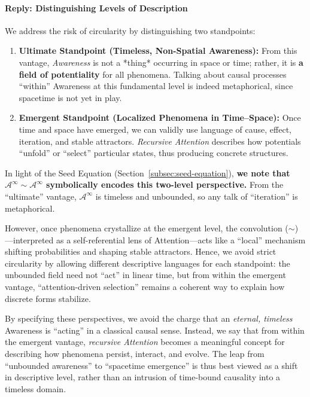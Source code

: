 \documentclass[12pt,a4paper]{article}
\begin{document}
\paragraph{Reply: Distinguishing Levels of Description}
We address the risk of circularity by distinguishing two standpoints:
\begin{enumerate}
    \item \textbf{Ultimate Standpoint (Timeless, Non-Spatial Awareness):}  
    From this vantage, \emph{Awareness} is not a *thing* occurring in space or time; rather, it is \textbf{a field of potentiality} for all phenomena. Talking about causal processes “within” Awareness at this fundamental level is indeed metaphorical, since spacetime is not yet in play.

    \item \textbf{Emergent Standpoint (Localized Phenomena in Time--Space):}  
    Once time and space have emerged, we can validly use language of cause, effect, iteration, and stable attractors. \emph{Recursive Attention} describes how potentials “unfold” or “select” particular states, thus producing concrete structures.  
\end{enumerate}

\noindent
In light of the Seed Equation (Section~\ref{subsec:seed-equation}), \textbf{we note that \(\mathscr{A}^\infty \sim \mathscr{A}^\infty\) symbolically encodes this two-level perspective.}  
From the “ultimate” vantage, \(\mathscr{A}^\infty\) is timeless and unbounded, so any talk of “iteration” is metaphorical.

However, once phenomena crystallize at the emergent level, the convolution (\(\sim\))---interpreted as a self-referential lens of Attention---acts like a “local” mechanism shifting probabilities and shaping stable attractors.  
Hence, we avoid strict circularity by allowing different descriptive languages for each standpoint: 
the unbounded field need not “act” in linear time, but from within the emergent vantage, “attention-driven selection” remains a coherent way to explain how discrete forms stabilize.

By specifying these perspectives, we avoid the charge that an \emph{eternal, timeless} Awareness is “acting” in a classical causal sense. Instead, we say that from within the emergent vantage, \emph{recursive Attention} becomes a meaningful concept for describing how phenomena persist, interact, and evolve. The leap from “unbounded awareness” to “spacetime emergence” is thus best viewed as a shift in descriptive level, rather than an intrusion of time-bound causality into a timeless domain.
\end{document}

